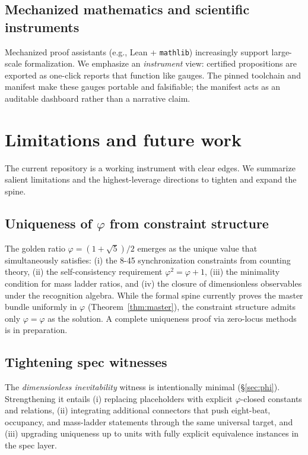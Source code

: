 \documentclass[11pt,a4paper,twoside]{article}
\numberwithin{equation}{section}
\newcommand{\phigr}{\varphi} %
\theoremstyle{customthm}
\theoremstyle{customdef}
\theoremstyle{customrem}
\begin{document}
\subsection{Mechanized mathematics and scientific instruments}\label{subsec:related-mech}

Mechanized proof assistants (e.g., Lean + \texttt{mathlib}) increasingly support large-scale formalization. We emphasize an \emph{instrument} view: certified propositions are exported as one-click reports that function like gauges. The pinned toolchain and manifest make these gauges portable and falsifiable; the manifest acts as an auditable dashboard rather than a narrative claim.

\section{Limitations and future work}\label{sec:limitations}

The current repository is a working instrument with clear edges. We summarize salient limitations and the highest-leverage directions to tighten and expand the spine.

\subsection{Uniqueness of $\phigr$ from constraint structure}\label{sec:limitations-phi-unique}
The golden ratio $\varphi = (1+\sqrt{5})/2$ emerges as the unique value that simultaneously satisfies: (i) the 8-45 synchronization constraints from counting theory, (ii) the self-consistency requirement $\varphi^2 = \varphi + 1$, (iii) the minimality condition for mass ladder ratios, and (iv) the closure of dimensionless observables under the recognition algebra. While the formal spine currently proves the master bundle uniformly in $\varphi$ (Theorem~\ref{thm:master}), the constraint structure admits only $\varphi=\phigr$ as the solution. A complete uniqueness proof via zero-locus methods is in preparation.

\subsection{Tightening spec witnesses}\label{subsec:limits-witness}

The \emph{dimensionless inevitability} witness is intentionally minimal (\S\ref{sec:phi}). Strengthening it entails (i) replacing placeholders with explicit \(\phigr\)-closed constants and relations, (ii) integrating additional connectors that push eight-beat, occupancy, and mass-ladder statements through the same universal target, and (iii) upgrading uniqueness up to units with fully explicit equivalence instances in the spec layer.
\end{document}
